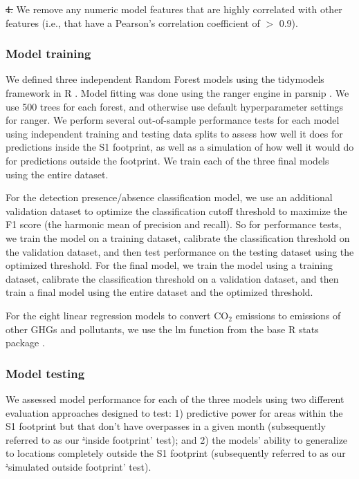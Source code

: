 \documentclass[lineno,pdflatex,sn-nature]{sn-jnl}
\makeatletter
\providecommand{\DIFadd}[1]{{\protect\color{blue}\uwave{#1}}} %
\providecommand{\DIFdel}[1]{{\protect\color{red}\sout{#1}}} %
\providecommand{\DIFaddbegin}{} %
\providecommand{\DIFaddend}{} %
\providecommand{\DIFdelbegin}{} %
\providecommand{\DIFdelend}{} %
\providecommand{\DIFscaledelfig}{0.5}
\newlength{\DIFdelgraphicswidth} %
\newlength{\DIFdelgraphicsheight} %
\providecommand{\DIFaddincludegraphics}[2][]{{\color{blue}\fbox{\DIFOincludegraphics[#1]{#2}}}} %
\providecommand{\DIFdelincludegraphics}[2][]{%
\sbox{\DIFdelgraphicsbox}{\DIFOincludegraphics[#1]{#2}}%
\settoboxwidth{\DIFdelgraphicswidth}{\DIFdelgraphicsbox} %
\settoboxtotalheight{\DIFdelgraphicsheight}{\DIFdelgraphicsbox} %
\scalebox{\DIFscaledelfig}{%
\parbox[b]{\DIFdelgraphicswidth}{\usebox{\DIFdelgraphicsbox}\\[-\baselineskip] \rule{\DIFdelgraphicswidth}{0em}}\llap{\resizebox{\DIFdelgraphicswidth}{\DIFdelgraphicsheight}{%
\setlength{\unitlength}{\DIFdelgraphicswidth}%
\begin{picture}(1,1)%
\thicklines\linethickness{2pt} %
{\color[rgb]{1,0,0}\put(0,0){\framebox(1,1){}}}%
{\color[rgb]{1,0,0}\put(0,0){\line( 1,1){1}}}%
{\color[rgb]{1,0,0}\put(0,1){\line(1,-1){1}}}%
\end{picture}%
}\hspace*{3pt}}} %
} %
\DeclareRobustCommand{\DIFaddbegin}{\DIFOaddbegin \let\includegraphics\DIFaddincludegraphics} %
\DeclareRobustCommand{\DIFaddend}{\DIFOaddend \let\includegraphics\DIFOincludegraphics} %
\DeclareRobustCommand{\DIFdelbegin}{\DIFOdelbegin \let\includegraphics\DIFdelincludegraphics} %
\DeclareRobustCommand{\DIFdelend}{\DIFOaddend \let\includegraphics\DIFOincludegraphics} %
\let\sout@orig\sout %
\renewcommand{\sout}[1]{\ifmmode\text{\sout@orig{\ensuremath{#1}}}\else\sout@orig{#1}\fi} %
\makeatother
\begin{document}
\DIFdelbegin \DIFdel{4. }\DIFdelend \DIFaddbegin \DIFadd{3. }\DIFaddend We remove any numeric model features that are highly correlated with other features (i.e., that have a Pearson's correlation coefficient of $>$ 0.9).

\subsubsection{Model training}

We defined three independent Random Forest models using the tidymodels framework in R \cite{tidymodels}. Model fitting was done using the ranger engine \cite{ranger} in parsnip \cite{parsnip}. We  use 500 trees for each forest, and otherwise use default hyperparameter settings for ranger. We perform several out-of-sample performance tests for each model using independent training and testing data splits to assess how well it does for predictions inside the S1 footprint, as well as a simulation of how well it would do for predictions outside the footprint. We train each of the three final models using the entire dataset.

For the detection presence/absence classification model, we use an additional validation dataset to optimize the classification cutoff threshold to maximize the F1 score (the harmonic mean of precision and recall). So for performance tests, we train the model on a training dataset, calibrate the classification threshold on the validation dataset, and then test performance on the testing dataset using the optimized threshold. For the final model, we train the model using a training dataset, calibrate the classification threshold on a validation dataset, and then train a final model using the entire dataset and the optimized threshold.

For the eight linear regression models to convert CO$_2$ emissions to emissions of other GHGs and pollutants, we use the lm function from the base R stats package \cite{r}.

\subsubsection{Model testing}

We assessed model performance for each of the three models using two different evaluation approaches designed to test: 1) predictive power for areas within the S1 footprint but that don't have overpasses in a given month (subsequently referred to as our \DIFdelbegin \DIFdel{'}\DIFdelend \DIFaddbegin \DIFadd{`}\DIFaddend inside footprint' test); and 2) the models' ability to generalize to locations completely outside the S1 footprint (subsequently referred to as our \DIFdelbegin \DIFdel{'}\DIFdelend \DIFaddbegin \DIFadd{`}\DIFaddend simulated outside footprint' test).
\end{document}
